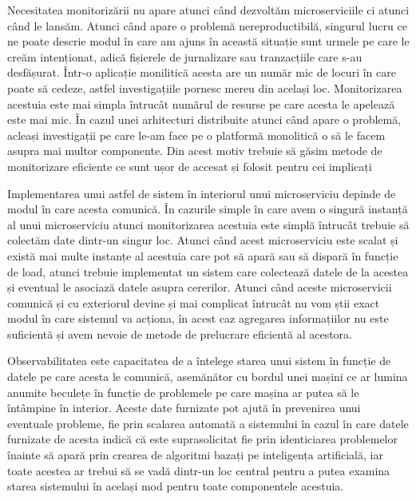 Necesitatea monitorizării nu apare atunci când dezvoltăm microserviciile ci atunci când le lansăm.
Atunci când apare o problemă nereproductibilă, singurul lucru ce ne poate descrie modul în care am ajuns în
această situație sunt urmele pe care le creăm intenționat, adică fișierele de jurnalizare
sau tranzacțiile care s-au desfășurat. Într-o aplicație monilitică acesta are un număr mic 
de locuri în care poate să cedeze, astfel investigațiile pornesc mereu din același loc. Monitorizarea
acestuia este mai simpla întrucât numărul de resurse pe care acesta le apelează este mai mic.
În cazul unei arhitecturi distribuite atunci când apare o problemă, acleași investigații
pe care le-am face pe o platformă monolitică o să le facem asupra mai multor componente.
Din acest motiv trebuie să găsim metode de monitorizare eficiente ce sunt ușor de accesat
și folosit pentru cei implicați

Implementarea unui astfel de sistem în interiorul unui microserviciu depinde de modul în care
acesta comunică. În cazurile simple în care avem o singură instanță al unui microserviciu
atunci monitorizarea acestuia este simplă întrucât trebuie să colectăm date dintr-un singur loc.
Atunci când acest microserviciu este scalat și există mai multe instanțe al acestuia care
pot să apară sau să dispară în funcție de load, atunci trebuie implementat un sistem
care colectează datele de la acestea și eventual le asociază datele asupra cererilor. Atunci când
aceste microservicii comunică și cu exteriorul devine și mai complicat întrucât nu vom știi
exact modul în care sistemul va acționa, în acest caz agregarea informațiilor nu este suficientă
și avem nevoie de metode de prelucrare eficientă al acestora.

Observabilitatea este capacitatea de a întelege starea unui sistem în funcție de datele pe care
acesta le comunică, asemănător cu bordul unei mașini ce ar lumina anumite beculețe în funcție 
de problemele pe care mașina ar putea să le întâmpine în interior. Aceste date furnizate pot
ajută în prevenirea unui eventuale probleme, fie prin scalarea automată a sistemului în cazul în care
datele furnizate de acesta indică că este suprasolicitat fie prin identiciarea problemelor 
înainte să apară prin crearea de algoritmi bazați pe inteligența artificială, iar toate acestea
ar trebui să se vadă dintr-un loc central pentru a putea examina starea sistemului în același 
mod pentru toate componentele acestuia.

